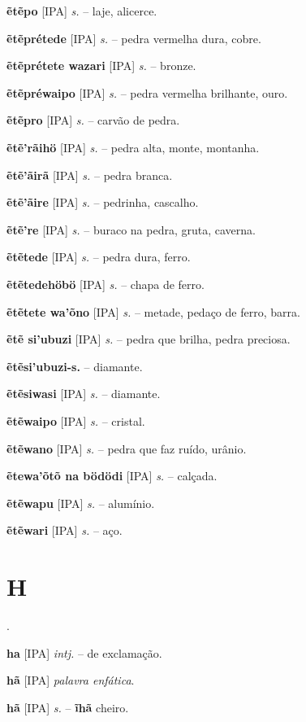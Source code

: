 \textbf{ẽtẽpo} [IPA] \textit{s.} -- laje, alicerce.

\textbf{ẽtẽprétede} [IPA] \textit{s.} -- pedra vermelha dura, cobre.

\textbf{ẽtẽprétete wazari} [IPA] \textit{s.} -- bronze.

\textbf{ẽtẽpréwaipo} [IPA] \textit{s.} -- pedra vermelha brilhante, ouro.

\textbf{ẽtẽpro} [IPA] \textit{s.} -- carvão de pedra.

\textbf{ẽtẽ'rãihö} [IPA] \textit{s.} -- pedra alta, monte, montanha.

\textbf{ẽtẽ'ãirã} [IPA] \textit{s.} -- pedra branca.

\textbf{ẽtẽ'ãire} [IPA] \textit{s.} -- pedrinha, cascalho.

\textbf{ẽtẽ're} [IPA] \textit{s.} -- buraco na pedra, gruta, caverna.

\textbf{ẽtẽtede} [IPA] \textit{s.} -- pedra dura, ferro.

\textbf{ẽtẽtedehöbö} [IPA] \textit{s.} -- chapa de ferro.

\textbf{ẽtẽtete wa'õno} [IPA] \textit{s.} -- metade, pedaço de ferro, barra.

\textbf{ẽtẽ si'ubuzi} [IPA] \textit{s.} -- pedra que brilha, pedra preciosa.

\textbf{ẽtẽsi'ubuzi-s.} -- diamante.

\textbf{ẽtẽsiwasi} [IPA] \textit{s.} -- diamante.

\textbf{ẽtẽwaipo} [IPA] \textit{s.} -- cristal.

\textbf{ẽtẽwano} [IPA] \textit{s.} -- pedra que faz ruído, urânio.

\textbf{ẽtewa'õtõ na bödödi} [IPA] \textit{s.} -- calçada.

\textbf{ẽtẽwapu} [IPA] \textit{s.} -- alumínio.

\textbf{ẽtẽwari} [IPA] \textit{s.} -- aço.


\section*{H}.



\textbf{ha} [IPA] \textit{intj.} -- de exclamação.

\textbf{hã} [IPA] \textit{palavra enfática}.

\textbf{hã} [IPA] \textit{s.} -- \textbf{ĩhã} cheiro.

